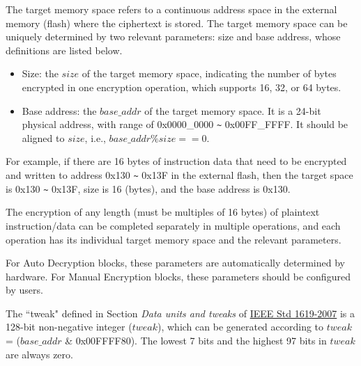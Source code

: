 \documentclass[main\_\_EN.tex]{subfiles}
\begin{document}
The target memory space refers to a continuous address space in the external memory (flash) where the ciphertext is stored. The target memory space can be uniquely determined by two relevant parameters: size and base address, whose definitions are listed below.

\begin{itemize}
    \item Size: the \begin{math} size \end{math} of the target memory space, indicating the number of bytes encrypted in one encryption operation, which supports 16, 32, or 64 bytes.
    \item Base address: the \begin{math} base\_addr\end{math} of the target memory space. It is a 24-bit physical address, with range of 0x0000\_0000 \verb+~+ 0x00FF\_FFFF. It should be aligned to \begin{math} size \end{math}, i.e., \begin{math} base\_addr \% size == 0 \end{math}.
\end{itemize}

For example, if there are 16 bytes of instruction data that need to be encrypted and written to address 0x130 \verb+~+ 0x13F in the external flash, then the target space is 0x130 \verb+~+ 0x13F, size is 16 (bytes), and the base address is 0x130.

The encryption of any length (must be multiples of 16 bytes) of plaintext instruction/data can be completed separately in multiple operations, and each operation has its individual target memory space and the relevant parameters.

For Auto Decryption blocks, these parameters are automatically determined by hardware. For Manual Encryption blocks, these parameters should be configured by users.

\begin{tiplisting}
\vspace{-2em}
\begin{enumerate}
    The ``tweak" defined in Section \textit{Data units and tweaks} of \href{https://ieeexplore.ieee.org/document/4493450}{IEEE Std 1619-2007} is a 128-bit non-negative integer (\begin{math} tweak \end{math}), which can be generated according to \begin{math} tweak \end{math} = (\begin{math} base\_addr \end{math} \& 0x00FFFF80). The lowest 7 bits and the highest 97 bits in \begin{math} tweak \end{math} are always zero.
\end{enumerate}
\end{tiplisting}
\end{document}
